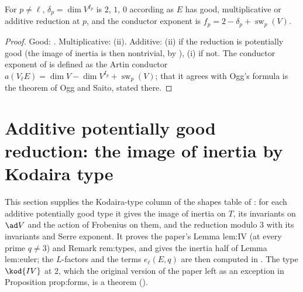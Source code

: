 \begin{corollary}\label{cor:galrep:delta}
For $p\ne\ell$, $\delta_p=\dim V^{I_p}$ is $2$, $1$, $0$ according as $E$ has good, multiplicative or additive reduction at $p$, and the conductor
exponent is $f_p=2-\delta_p+\operatorname{sw}_p(V)$.
\end{corollary}

\begin{proof}
Good: . Multiplicative: (ii). Additive: (ii) if the reduction is
potentially good (the image of inertia is then nontrivial, by ), (i) if not. The conductor
exponent of  is defined as the Artin conductor $a(V_\ell E)=\dim V-\dim V^{I_p}+\operatorname{sw}_p(V)$; that it agrees with Ogg's formula
is the theorem of Ogg and Saito, stated there.
\end{proof}

\section[Additive potentially good reduction]{Additive potentially good reduction: the image of inertia by Kodaira type}\label{sec:galrep:additive}

This section supplies the Kodaira-type column of the shapes table of : for each additive potentially good type it gives
the image of inertia on $T$, its invariants on $\ad V$ and the action of Frobenius on them, and the reduction modulo $3$ with its invariants
and Serre exponent. It proves the paper's Lemma lem:IV (at every prime $q\ne3$) and Remark rem:types, and gives the inertia half of Lemma
lem:euler; the $L$-factors and the terms $e_\ell(E,q)$ are then computed in . The type $\kod{IV}$ at $2$, which the original
version of the paper left as an exception in Proposition prop:forms, is a theorem ().

